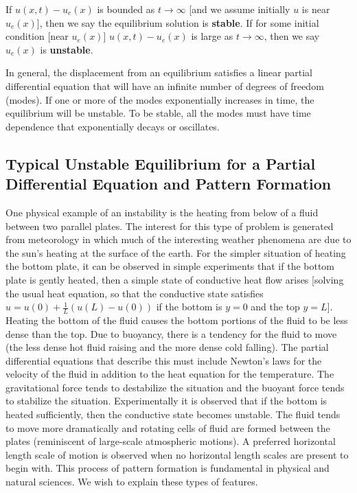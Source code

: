 If $u(x,t) - u_e(x)$ is bounded as $t \to \infty$ [and we assume initially $u$ is near $u_e(x)$], then we say the equilibrium solution is \textbf{stable}. If for some initial condition [near $u_e(x)$] $u(x,t) - u_e(x)$ is large as $t \to \infty$, then we say $u_e(x)$ is \textbf{unstable}.

In general, the displacement from an equilibrium satisfies a linear partial differential equation that will have an infinite number of degrees of freedom (modes). If one or more of the modes exponentially increases in time, the equilibrium will be unstable. To be stable, all the modes must have time dependence that exponentially decays or oscillates.

\subsection{Typical Unstable Equilibrium for a Partial Differential Equation and Pattern Formation}
\label{subsec:14.8.3}

One physical example of an instability is the heating from below of a fluid between two parallel plates. The interest for this type of problem is generated from meteorology in which much of the interesting weather phenomena are due to the sun's heating at the surface of the earth. For the simpler situation of heating the bottom plate, it can be observed in simple experiments that if the bottom plate is gently heated, then a simple state of conductive heat flow arises [solving the usual heat equation, so that the conductive state satisfies $u = u(0) + \frac{1}{L}(u(L) - u(0))$ if the bottom is $y = 0$ and the top $y = L$]. Heating the bottom of the fluid causes the bottom portions of the fluid to be less dense than the top. Due to buoyancy, there is a tendency for the fluid to move (the less dense hot fluid raising and the more dense cold falling). The partial differential equations that describe this must include Newton's laws for the velocity of the fluid in addition to the heat equation for the temperature. The gravitational force tends to destabilize the situation and the buoyant force tends to stabilize the situation. Experimentally it is observed that if the bottom is heated sufficiently, then the conductive state becomes unstable. The fluid tends to move more dramatically and rotating cells of fluid are formed between the plates (reminiscent of large-scale atmospheric motions). A preferred horizontal length scale of motion is observed when no horizontal length scales are present to begin with. This process of pattern formation is fundamental in physical and natural sciences. We wish to explain these types of features.

